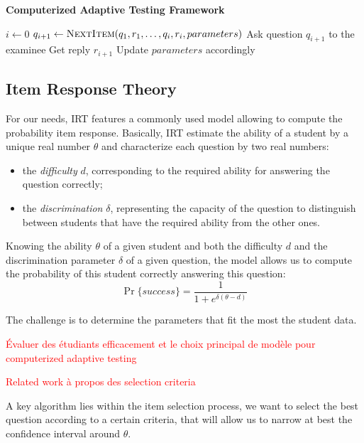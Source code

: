 \documentclass{sig-alternate}
\newcommand\alert[1]{\textcolor{red}{#1}}
\begin{document}
\begin{algorithm}
\caption*{\textbf{Computerized Adaptive Testing Framework}}
\begin{algorithmic}
\State $i \gets 0$
	\State $q_{i + 1} \gets \Call{NextItem}{q_1, r_1, \ldots, q_i, r_i, parameters}$
	\State Ask question $q_{i + 1}$ to the examinee
	\State Get reply $r_{i + 1}$
	\State Update $parameters$ accordingly
\EndWhile
\EndProcedure
\end{algorithmic}
\end{algorithm}

\subsection{Item Response Theory}

For our needs, IRT features a commonly used model allowing to compute the probability item response. Basically, IRT estimate the ability of a student by a unique real number $\theta$ and characterize each question by two real numbers:

\begin{itemize}
\item the \emph{difficulty} $d$, corresponding to the required ability for answering the question correctly; %
\item the \emph{discrimination} $\delta$, representing the capacity of the question to distinguish between students that have the required ability from the other ones.
\end{itemize}

Knowing the ability $\theta$ of a given student and both the difficulty $d$ and the discrimination parameter $\delta$ of a given question, the model allows us to compute the probability of this student correctly answering this question:
\[ \Pr\{success\} = \frac1{1+e^{\delta(\theta - d)}} \]

The challenge is to determine the parameters that fit the most the student data.

\alert{Évaluer des étudiants efficacement et le choix principal de modèle pour computerized adaptive testing}

\alert{Related work à propos des selection criteria}

A key algorithm lies within the item selection process, we want to select the best question according to a certain criteria, that will allow us to narrow at best the confidence interval around $\theta$.
\end{document}
